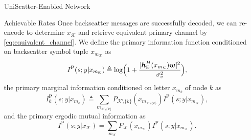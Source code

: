\documentclass[journal]{IEEEtran}
\begin{document}
\begin{section}{UniScatter-Enabled Network}
\begin{subsection}{Achievable Rates}
		Once backscatter messages are successfully decoded, we can re-encode to determine $x_{\mathcal{K}}$ and retrieve equivalent primary channel by \eqref{eq:equivalent_channel}. We define the primary information function conditioned on backscatter symbol tuple $x_{m_{\mathcal{K}}}$ as
		\begin{equation}
			I^{\mathrm{P}}(s;y|x_{m_{\mathcal{K}}}) \triangleq \log \Bigl(1 + \frac{\lvert \boldsymbol{h}_{\mathrm{E}}^H(x_{m_{\mathcal{K}}}) \boldsymbol{w} \rvert^2}{\sigma_v^2}\Bigr),
			\label{eq:primary_information_function}
		\end{equation}
		the primary marginal information conditioned on letter $x_{m_k}$ of node $k$ as
		\begin{equation}
			I^{\mathrm{P}}_{k}(s;y|x_{m_k}) \triangleq \sum_{m_{\mathcal{K} \setminus \{k\}}} P_{\mathcal{K} \setminus \{k\}}(x_{m_{\mathcal{K} \setminus \{k\}}}) I^{\mathrm{P}}(s;y|x_{m_{\mathcal{K}}}),
			\label{eq:primary_marginal_information}
		\end{equation}
		and the primary ergodic mutual information as
		\begin{equation}
			I^{\mathrm{P}}(s;y|x_{\mathcal{K}}) = \sum_{m_{\mathcal{K}}} P_{\mathcal{K}}(x_{m_{\mathcal{K}}}) I^{\mathrm{P}}(s;y|x_{m_{\mathcal{K}}}).
			\label{eq:primary_mutual_information}
		\end{equation}


\end{subsection}
\end{section}
\end{document}
